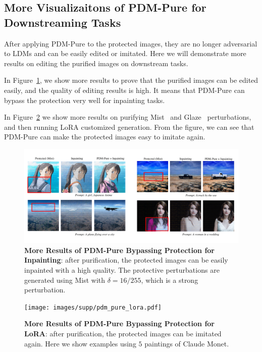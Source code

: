 \subsection{More Visualizaitons of PDM-Pure for Downstreaming Tasks}

After applying PDM-Pure to the protected images, they are no longer adversarial to LDMs and can be easily edited or imitated. Here we will demonstrate more results on editing the purified images on downstream tasks.


In Figure~\ref{fig:supp:pdm_pure_inpainting}, we show more results to prove that the purified images can be edited easily, and the quality of editing results is high. It means that PDM-Pure can bypass the protection very well for inpainting tasks.

In Figure~\ref{fig:supp:pdm_pure_lora} we show more results on purifying Mist~\cite{liang2023mist} and Glaze~\cite{glaze} perturbations, and then running LoRA customized generation. From the figure, we can see that PDM-Pure can make the protected images easy to imitate again.

\begin{figure}
    \centering
    \includegraphics[width=.99\textwidth]{images/supp/pdm_pure_inpainting.pdf}
    \caption{\textbf{More Results of PDM-Pure Bypassing Protection for Inpainting}: after purification, the protected images can be easily inpainted with a high quality. The protective perturbations are generated using Mist with $\delta=16/255$, which is a strong perturbation.}
    \label{fig:supp:pdm_pure_inpainting}
\end{figure}




\begin{figure}
    \centering
    \texttt{[image: images/supp/pdm\_pure\_lora.pdf]}
    \caption{\textbf{More Results of PDM-Pure Bypassing Protection for LoRA}: after purification, the protected images can be imitated again. Here we show examples using $5$ paintings of Claude Monet.}
    \label{fig:supp:pdm_pure_lora}
\end{figure}


